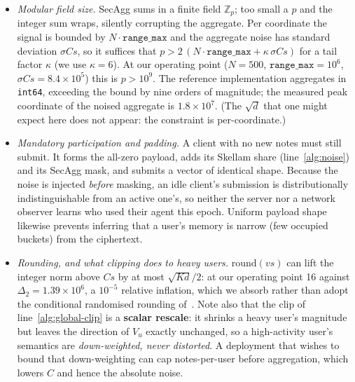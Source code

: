 \documentclass[pdflatex,sn-mathphys-num,iicol]{sn-jnl}
\theoremstyle{thmstyleone}%
\theoremstyle{thmstyletwo}%
\theoremstyle{thmstylethree}%
\newcommand{\Z}{\mathbb{Z}}
\begin{document}
\begin{itemize}
  \item \emph{Modular field size.} SecAgg sums in a finite field $\Z_p$; too small
    a $p$ and the integer sum wraps, silently corrupting the aggregate. Per
    coordinate the signal is bounded by $N \cdot \texttt{range\_max}$ and the
    aggregate noise has standard deviation $\sigma C s$, so it suffices that
    $p > 2\,(N \cdot \texttt{range\_max} + \kappa\,\sigma C s)$ for a tail factor
    $\kappa$ (we use $\kappa = 6$). At our operating point ($N = 500$,
    $\texttt{range\_max} = 10^{6}$, $\sigma C s = 8.4 \times 10^{5}$) this is
    $p > 10^{9}$. The reference implementation aggregates in \texttt{int64},
    exceeding the bound by nine orders of magnitude; the measured peak coordinate of
    the noised aggregate is $1.8 \times 10^{7}$. (The $\sqrt{d}$ that one might
    expect here does not appear: the constraint is per-coordinate.)

  \item \emph{Mandatory participation and padding.} A client with no new notes must
    still submit. It forms the all-zero payload, adds its Skellam share
    (line~\ref{alg:noise}) and its SecAgg mask, and submits a vector of identical
    shape. Because the noise is injected \emph{before} masking, an idle client's
    submission is distributionally indistinguishable from an active one's, so
    neither the server nor a network observer learns who used their agent this
    epoch. Uniform payload shape likewise prevents inferring that a user's memory is
    narrow (few occupied buckets) from the ciphertext.

  \item \emph{Rounding, and what clipping does to heavy users.} $\mathrm{round}(v s)$
    can lift the integer norm above $C s$ by at most $\sqrt{K d}/2$: at our operating
    point 16 against $\Delta_2 = 1.39 \times 10^{6}$, a $10^{-5}$ relative inflation,
    which we absorb rather than adopt the conditional randomised rounding
    of~\cite{kairouz2021ddgauss}. Note also that the clip of
    line~\ref{alg:global-clip} is a \textbf{scalar rescale}: it shrinks a heavy
    user's magnitude but leaves the direction of $V_u$ exactly unchanged, so a
    high-activity user's semantics are \emph{down-weighted, never distorted}. A
    deployment that wishes to bound that down-weighting can cap notes-per-user before
    aggregation, which lowers $C$ and hence the absolute noise.
\end{itemize}
\end{document}
